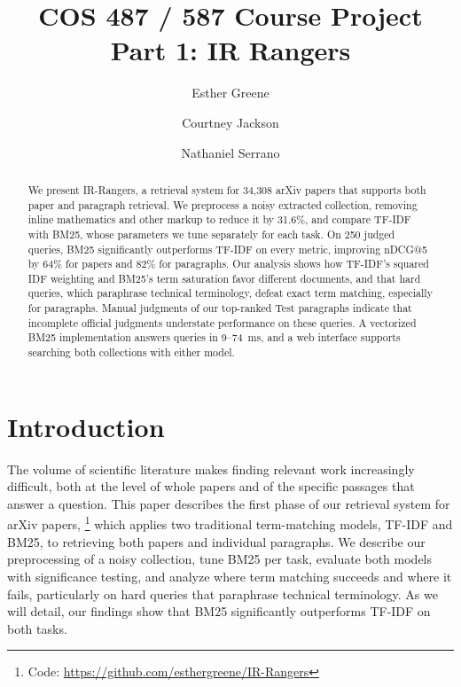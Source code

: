 \documentclass[sigconf,nonacm]{acmart}
\begin{document}
\title{COS 487 / 587 Course Project Part 1: IR Rangers}

\author{Esther Greene}

\author{Courtney Jackson}

\author{Nathaniel Serrano}

\begin{abstract}
We present IR-Rangers, a retrieval system for 34,308 arXiv papers that supports both paper 
and paragraph retrieval. We preprocess a noisy extracted collection, removing inline 
mathematics and other markup to reduce it by 31.6\%, and compare TF-IDF with BM25, 
whose parameters we tune separately for each task. On 250 judged queries, BM25 significantly 
outperforms TF-IDF on every metric, improving nDCG@5 by 64\% for papers and 82\% for 
paragraphs. Our analysis shows how TF-IDF's squared IDF weighting and BM25's term 
saturation favor different documents, and that hard queries, which paraphrase technical 
terminology, defeat exact term matching, especially for paragraphs. Manual judgments of our 
top-ranked Test paragraphs indicate that incomplete official judgments understate performance 
on these queries. A vectorized BM25 implementation answers queries in 9--74~ms, and a web interface 
supports searching both collections with either model.
\end{abstract}


\maketitle

\section{Introduction}
The volume of scientific literature makes finding relevant work
increasingly difficult, both at the level of whole papers and of the
specific passages that answer a question. This paper describes the first
phase of our retrieval system for arXiv papers, \footnote{Code: \url{https://github.com/esthergreene/IR-Rangers}} 
which applies two traditional term-matching models, TF-IDF and BM25, to 
retrieving both papers and individual paragraphs. We describe our preprocessing 
of a noisy collection, tune BM25 per task, evaluate both models with
significance testing, and analyze where term matching succeeds and where
it fails, particularly on hard queries that paraphrase technical
terminology. As we will detail, our findings show that BM25 
significantly outperforms TF-IDF on both tasks.
\end{document}

